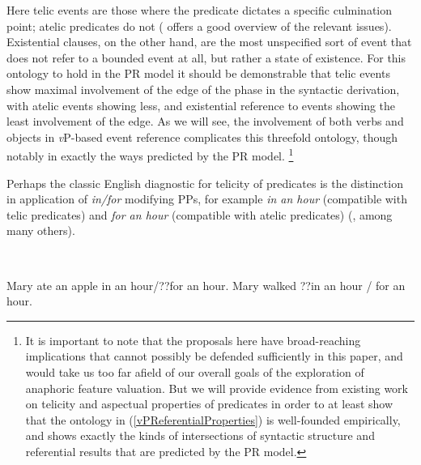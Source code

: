 \documentclass[output=paper
,modfonts
,nonflat
]{langsci/langscibook}
\begin{document}
\z
\noindent Here telic events are those where the predicate dictates a specific culmination point; atelic predicates do not (\citealt{Beavers:2012} offers a good overview of the relevant issues). Existential clauses, on the other hand, are the most unspecified sort of event that does not refer to a bounded event at all, but rather a state of existence. For this ontology to hold in the PR model it should be demonstrable that telic events show maximal involvement of the edge of the phase in the syntactic derivation, with atelic events showing less, and existential reference to events showing the least involvement of the edge. As we will see, the involvement of both verbs and objects in \textit{v}P-based event reference complicates this threefold ontology, though notably in exactly the ways predicted by the PR model. \footnote{It is important to note that the proposals here have broad-reaching implications that cannot possibly be defended sufficiently in this paper, and would take us too far afield of our overall goals of the exploration of anaphoric feature valuation. But we will provide evidence from existing work on telicity and aspectual properties of predicates in order to at least show that the ontology in (\ref{vPReferentialProperties}) is well-founded empirically, and shows exactly the kinds of intersections of syntactic structure and referential results that are predicted by the PR model.} 

Perhaps the classic English diagnostic for telicity of predicates is the distinction in application of \textit{in/for} modifying PPs, for example \textit{in an hour} (compatible with telic predicates) and \textit{for an hour} (compatible with atelic predicates) (\citealt{Vendler:1967,Dowty:1979,Thompson:2006,Beavers:2012}, among many others). 

\ea
{} \\
\begin{xlist}
\ex Mary ate an apple in an hour/??for an hour.   
\ex Mary walked ??in an hour / for an hour.
\end{xlist}
\end{document}
